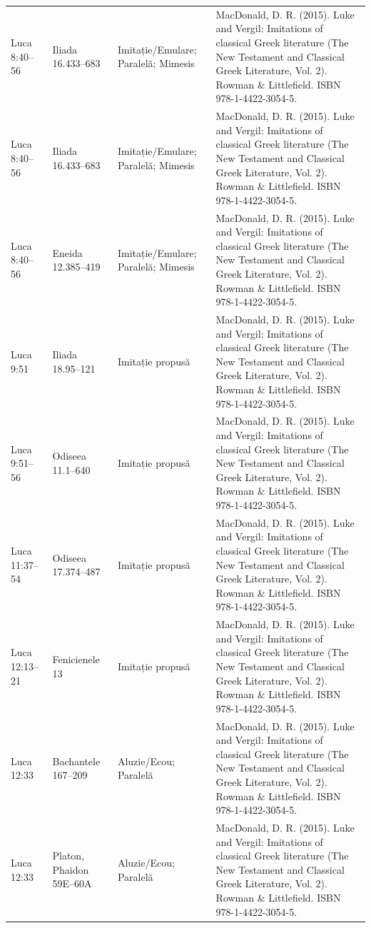 \documentclass[12pt,a4paper,twoside,openany]{book}
\begin{document}
\begin{longtable}{L{1.4cm}L{1.7cm}L{3.1cm}L{8.4cm}}
Luca 8:40–56 & Iliada 16.433–683 & Imitație/Emulare; Paralelă; Mimesis & MacDonald, D. R. (2015). Luke and Vergil: Imitations of classical Greek literature (The New Testament and Classical Greek Literature, Vol. 2). Rowman \& Littlefield. ISBN 978-1-4422-3054-5. \\
Luca 8:40–56 & Iliada 16.433–683 & Imitație/Emulare; Paralelă; Mimesis & MacDonald, D. R. (2015). Luke and Vergil: Imitations of classical Greek literature (The New Testament and Classical Greek Literature, Vol. 2). Rowman \& Littlefield. ISBN 978-1-4422-3054-5. \\
Luca 8:40–56 & Eneida 12.385–419 & Imitație/Emulare; Paralelă; Mimesis & MacDonald, D. R. (2015). Luke and Vergil: Imitations of classical Greek literature (The New Testament and Classical Greek Literature, Vol. 2). Rowman \& Littlefield. ISBN 978-1-4422-3054-5. \\
Luca 9:51 & Iliada 18.95–121 & Imitație propusă & MacDonald, D. R. (2015). Luke and Vergil: Imitations of classical Greek literature (The New Testament and Classical Greek Literature, Vol. 2). Rowman \& Littlefield. ISBN 978-1-4422-3054-5. \\
Luca 9:51–56 & Odiseea 11.1–640 & Imitație propusă & MacDonald, D. R. (2015). Luke and Vergil: Imitations of classical Greek literature (The New Testament and Classical Greek Literature, Vol. 2). Rowman \& Littlefield. ISBN 978-1-4422-3054-5. \\
Luca 11:37–54 & Odiseea 17.374–487 & Imitație propusă & MacDonald, D. R. (2015). Luke and Vergil: Imitations of classical Greek literature (The New Testament and Classical Greek Literature, Vol. 2). Rowman \& Littlefield. ISBN 978-1-4422-3054-5. \\
Luca 12:13–21 & Fenicienele 13 & Imitație propusă & MacDonald, D. R. (2015). Luke and Vergil: Imitations of classical Greek literature (The New Testament and Classical Greek Literature, Vol. 2). Rowman \& Littlefield. ISBN 978-1-4422-3054-5. \\
Luca 12:33 & Bachantele 167–209 & Aluzie/Ecou; Paralelă & MacDonald, D. R. (2015). Luke and Vergil: Imitations of classical Greek literature (The New Testament and Classical Greek Literature, Vol. 2). Rowman \& Littlefield. ISBN 978-1-4422-3054-5. \\
Luca 12:33 & Platon, Phaidon 59E–60A & Aluzie/Ecou; Paralelă & MacDonald, D. R. (2015). Luke and Vergil: Imitations of classical Greek literature (The New Testament and Classical Greek Literature, Vol. 2). Rowman \& Littlefield. ISBN 978-1-4422-3054-5. \\

\end{longtable}
\end{document}
